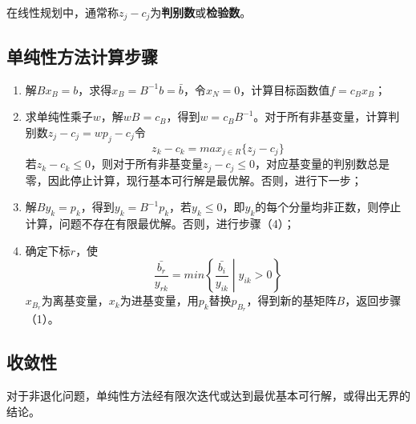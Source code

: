 在线性规划中，通常称$z_j - c_j$为\textbf{判别数}或\textbf{检验数}。

\subsection*{单纯性方法计算步骤}
\begin{enumerate}
	\item 解$Bx_{B} = b$，求得$x_B = B^{-1}b = \bar{b}$，令$x_N = 0$，计算目标函数值$f = c_Bx_B$；
	\item 求单纯性乘子$w$，解$wB = c_B$，得到$w = c_BB^{-1}$。对于所有非基变量，计算判别数$z_j - c_j = wp_j - c_j$令
	$$z_k - c_k = max_{j \in R}\{ z_j - c_j \}$$
	若$z_k - c_k \leq 0$，则对于所有非基变量$z_j - c_j \leq 0$，对应基变量的判别数总是零，因此停止计算，现行基本可行解是最优解。否则，进行下一步；
	\item 解$By_k = p_k$，得到$y_k = B^{-1}p_k$，若$y_k \leq 0$，即$y_k$的每个分量均非正数，则停止计算，问题不存在有限最优解。否则，进行步骤（4）；
	\item 确定下标$r$，使
	\begin{equation}
		\frac{\bar{b_r}}{y_{rk}} = min \left\{ \frac{\bar{b_i}}{y_{ik}} \middle | y_{ik} > 0 \right\}
	\end{equation}
	$x_{B_r}$为离基变量，$x_k$为进基变量，用$p_k$替换$p_{B_r}$，得到新的基矩阵$B$，返回步骤（1）。
\end{enumerate}
\subsection*{收敛性}
对于非退化问题，单纯性方法经有限次迭代或达到最优基本可行解，或得出无界的结论。